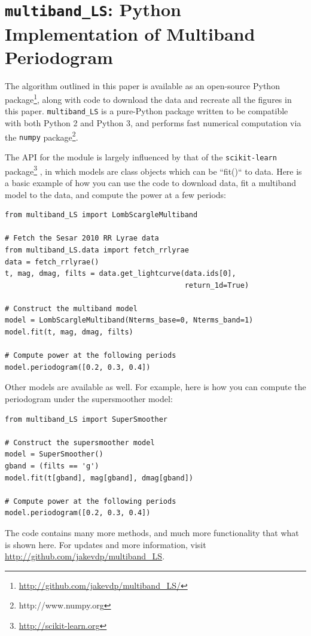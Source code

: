 \documentclass[12pt,preprint]{aastex}
\begin{document}



\appendix
\section{{\tt multiband\_LS}: Python Implementation of Multiband Periodogram}
The algorithm outlined in this paper is available as an open-source Python package\footnote{\url{http://github.com/jakevdp/multiband_LS/}}, along with code to download the data and recreate all the figures in this paper.
{\tt multiband\_LS} is a pure-Python package written to be compatible with both Python 2 and Python 3, and performs fast numerical computation via the {\tt numpy} package\footnote{http://www.numpy.org}.

The API for the module is largely influenced by that of the {\tt scikit-learn} package\footnote{\url{http://scikit-learn.org}} \citep{scikit-learn}, in which models are class objects which can be ``fit()`` to data.
Here is a basic example of how you can use the code to download data, fit a multiband model to the data, and compute the power at a few periods:

\begin{lstlisting}
from multiband_LS import LombScargleMultiband

# Fetch the Sesar 2010 RR Lyrae data
from multiband_LS.data import fetch_rrlyrae
data = fetch_rrlyrae()
t, mag, dmag, filts = data.get_lightcurve(data.ids[0],
                                          return_1d=True)

# Construct the multiband model
model = LombScargleMultiband(Nterms_base=0, Nterms_band=1)
model.fit(t, mag, dmag, filts)

# Compute power at the following periods
model.periodogram([0.2, 0.3, 0.4])
\end{lstlisting}

Other models are available as well. For example, here is how you can compute the periodogram under the supersmoother model:

\begin{lstlisting}
from multiband_LS import SuperSmoother

# Construct the supersmoother model
model = SuperSmoother()
gband = (filts == 'g')
model.fit(t[gband], mag[gband], dmag[gband])

# Compute power at the following periods
model.periodogram([0.2, 0.3, 0.4])
\end{lstlisting}

The code contains many more methods, and much more functionality that what is shown here. For updates and more information, visit \url{http://github.com/jakevdp/multiband_LS}.
\end{document}
